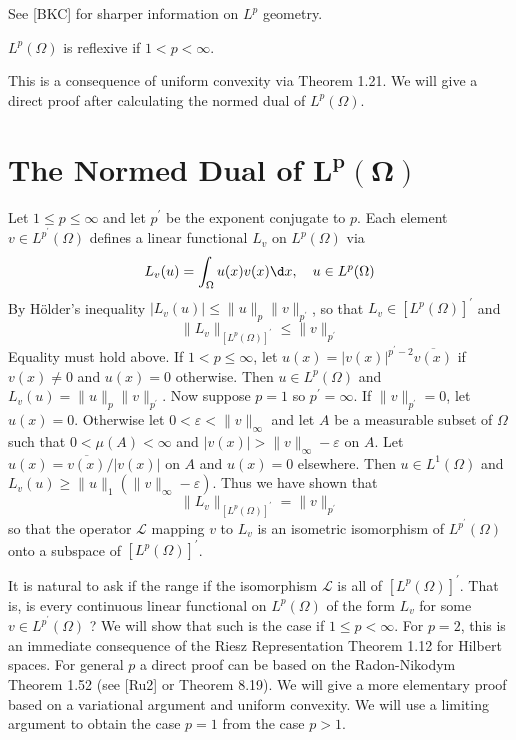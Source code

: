 See [BKC] for sharper information on $L^p$ geometry.

\begin{corollary}\label{cor:2.40}
  $L^p(\Omega)$ is reflexive if $1<p<\infty$.
\end{corollary}
This is a consequence of uniform convexity via Theorem 1.21.
We will give a direct proof after calculating the normed dual of $L^p(\Omega)$.


\section[The Normed Dual of $L^p(\Omega)$]{The Normed Dual of $\bm{L^p(\Omega)}$}


\begin{para}
  Let $1 \leq p \leq \infty$ and let $p^{\prime}$ be the exponent conjugate to $p$.
  Each element $v \in L^{p^{\prime}}(\Omega)$ defines a linear functional
  $L_v$ on $L^p(\Omega)$ via
  \[
  L_v(u)=\int_{\Omega} u(x) v(x) \d x, \quad u \in L^p(\Omega)
  \]
  By Hölder's inequality $\left|L_v(u)\right| \leq\|u\|_p\|v\|_{p^{\prime}}$, so that $L_v \in\left[L^p(\Omega)\right]^{\prime}$ and
  \[
  \|L_v\|_{\left[L^p(\Omega)\right]^{\prime}} \leq\|v\|_{p^{\prime}}
  \]
  Equality must hold above. If $1<p \leq \infty$, let $u(x)=|v(x)|^{p^{\prime}-2} \overline{v(x)}$ if $v(x) \neq 0$ and $u(x)=0$ otherwise. Then $u \in L^p(\Omega)$ and $L_v(u)=\|u\|_p\|v\|_{p^{\prime}}$.
  Now suppose $p=1$ so $p^{\prime}=\infty$. If $\|v\|_{p^{\prime}}=0$, let $u(x)=0$. Otherwise let $0<\varepsilon<\|v\|_{\infty}$ and let $A$ be a measurable subset of $\Omega$ such that $0<\mu(A)<\infty$
  and $|v(x)|>\|v\|_{\infty}-\varepsilon$ on $A$. Let $u(x)=\overline{v(x)} /|v(x)|$ on $A$ and $u(x)=0$ elsewhere. Then $u \in L^1(\Omega)$ and $L_v(u) \geq\|u\|_1\left(\|v\|_{\infty}-\varepsilon\right)$. Thus we have shown that
  \[
  \|L_v\|_{\left[L^p(\Omega)\right]^{\prime}}=\|v\|_{p^{\prime}}
  \]
  so that the operator $\mathcal{L}$ mapping $v$ to $L_v$ is an isometric isomorphism of $L^{p^{\prime}}(\Omega)$ onto a subspace of $\left[L^p(\Omega)\right]^{\prime}$.
\end{para}


\begin{para}
  It is natural to ask if the range if the isomorphism $\mathcal{L}$ is all of $\left[L^p(\Omega)\right]^{\prime}$. That is, is every continuous linear functional on $L^p(\Omega)$ of the form $L_v$ for some $v \in L^{p^{\prime}}(\Omega)$ ? We will show that such is the case if $1 \leq p<\infty$. For $p=2$, this is an immediate consequence of the Riesz Representation Theorem 1.12 for Hilbert spaces. For general $p$ a direct proof can be based on the Radon-Nikodym Theorem 1.52 (see [Ru2] or Theorem 8.19). We will give a more elementary proof based on a variational argument and uniform convexity. We will use a limiting argument to obtain the case $p=1$ from the case $p>1$.
\end{para}


